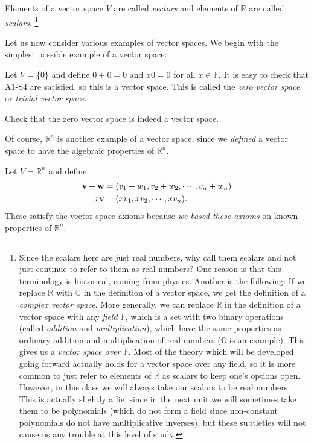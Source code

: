 \documentclass[12pt,letterpaper,reqno]{article}
\numberwithin{equation}{section}
\begin{document}
Elements of a vector space $V$ are called \emph{vectors} and elements of $\mathbb{R}$ are called \emph{scalars}. \footnote{Since the scalars here are just real numbers, why call them scalars and not just continue to refer to them as real numbers? One reason is that this terminology is historical, coming from physics. Another is the following: If we replace $\mathbb{R}$ with $\mathbb{C}$ in the definition of a vector space, we get the definition of a \emph{complex vector space}. More generally, we can replace $\mathbb{R}$ in the definition of a vector space with any  \emph{field} $\mathbb{F}$, which is a set with two binary operations (called \emph{addition} and \emph{multiplication}), which have the same properties as ordinary addition and multiplication of real numbers ($\mathbb{C}$ is an example). This gives us a \emph{vector space over} $\mathbb{F}$. Most of the theory which will be developed going forward actually holds for a vector space over any field, so it is more common to just refer to elements of $\mathbb{R}$ as scalars to keep one's options open. However, in this class we will always take our scalars to be real numbers. This is actually slightly a lie, since in the next unit we will sometimes take them to be polynomials (which do not form a field since non-constant polynomials do not have multiplicative inverses), but these subtleties will not cause us any trouble at this level of study.}

Let us now consider various examples of vector spaces. We begin with the simplest possible example of a vector space:

\begin{example}
	Let $V=\{0\}$ and define $0+0=0$ and $x0=0$ for all $x \in \mathbb{F}$. It is easy to check that A1-S4 are satisfied, so this is a vector space. This is called the \emph{zero vector space} or \emph{trivial vector space}.
\end{example}

\begin{exercise}
Check that the zero vector space is indeed a vector space.
\end{exercise}


Of course, $\mathbb{R}^n$ is another example of a vector space, since we \emph{defined} a vector space to have the algebraic properties of $\mathbb{R}^n$. 

\begin{example}[$\mathbb{R}^n$]
	Let $V=\mathbb{R}^n$ and define
\begin{align*}
	{\bf v}+{\bf w} &=(v_1+w_1,v_2+w_2,\cdots, v_n+w_n) \\
	x{\bf v} &=(xv_1, xv_2, \cdots, xv_n).
\end{align*} These satisfy the vector space axioms because \emph{we based these axioms} on known properties of $\mathbb{R}^n$.
\end{example}
\end{document}
